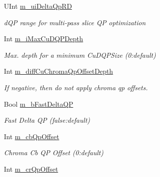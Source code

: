 \begin{DoxyCompactItemize}
U\+Int \hyperlink{class_t_app_enc_cfg_abef6196c36ebef24f6423ecead9f2fda}{m\+\_\+ui\+Delta\+Qp\+RD}
\begin{DoxyCompactList}\small\item\em d\+QP range for multi-\/pass slice QP optimization \end{DoxyCompactList}\item 
\mbox{\label{class_t_app_enc_cfg_a39249e3d75d5d15c7f8a9f1eb03bb497}} 
Int \hyperlink{class_t_app_enc_cfg_a39249e3d75d5d15c7f8a9f1eb03bb497}{m\+\_\+i\+Max\+Cu\+D\+Q\+P\+Depth}
\begin{DoxyCompactList}\small\item\em Max. depth for a minimum Cu\+D\+Q\+P\+Size (0\+:default) \end{DoxyCompactList}\item 
\mbox{\label{class_t_app_enc_cfg_aa66d16835c3eb7c4ee9aa7657781313b}} 
Int \hyperlink{class_t_app_enc_cfg_aa66d16835c3eb7c4ee9aa7657781313b}{m\+\_\+diff\+Cu\+Chroma\+Qp\+Offset\+Depth}
\begin{DoxyCompactList}\small\item\em If negative, then do not apply chroma qp offsets. \end{DoxyCompactList}\item 
\mbox{\label{class_t_app_enc_cfg_a4b33578abd493548030d809486717afe}} 
Bool \hyperlink{class_t_app_enc_cfg_a4b33578abd493548030d809486717afe}{m\+\_\+b\+Fast\+Delta\+QP}
\begin{DoxyCompactList}\small\item\em Fast Delta QP (false\+:default) \end{DoxyCompactList}\item 
\mbox{\label{class_t_app_enc_cfg_a9d8734ae0405376110e153ff73239d85}} 
Int \hyperlink{class_t_app_enc_cfg_a9d8734ae0405376110e153ff73239d85}{m\+\_\+cb\+Qp\+Offset}
\begin{DoxyCompactList}\small\item\em Chroma Cb QP Offset (0\+:default) \end{DoxyCompactList}\item 
\mbox{\label{class_t_app_enc_cfg_a44f4dde52fb4a5a6dba02f66602232e3}} 
Int \hyperlink{class_t_app_enc_cfg_a44f4dde52fb4a5a6dba02f66602232e3}{m\+\_\+cr\+Qp\+Offset}

\end{DoxyCompactItemize}
